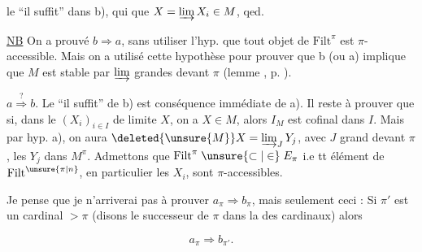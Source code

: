 
le ``il suffit'' dans b), qui   que $X=\varinjlim X_i\in M$, qed.

\uline{NB} On a prouvé $b\Rightarrow a$, sans utiliser l'hyp.  que tout objet de $\mathrm{Filt}^{\pi}$ est $\pi$-accessible. Mais on a utilisé cette hypothèse pour prouver que b  (ou a) implique que $M$ est stable par $\varinjlim$ grandes devant $\pi$ (lemme , p. ).

$a\overset{?}{\Longrightarrow}b$.  Le ``il suffit'' de b) est conséquence immédiate de a). Il reste à prouver que si, dans le   $(X_i)_{i\in I}$ de limite $X$, on a $X\in M$, alors $I_M$ est cofinal dans $I$. Mais par hyp. a), on aura $\deleted{\unsure{M}} X=\varinjlim_J Y_j$, avec $J$ grand devant $\pi$, les $Y_j$ dans $M^\pi$.  Admettons que $\mathrm{Filt}^\pi\mathrel{\unsure{\subset|\in}} E_\pi$ i.e tt élément de $\mathrm{Filt}^{\unsure{\pi|n}}$, en particulier les $X_i$, sont  $\pi$-accessibles.

Je pense que je n'arriverai pas à prouver $a_\pi\Rightarrow b_\pi$, mais seulement ceci : Si $\pi'$ est un cardinal $>\pi$ (disons le successeur de $\pi$ \unsure{$\aleph_{\unsure{\gamma|\eta}}$} dans la   des cardinaux) alors

\[
 a_\pi\Longrightarrow b_{\pi'}.
\]


